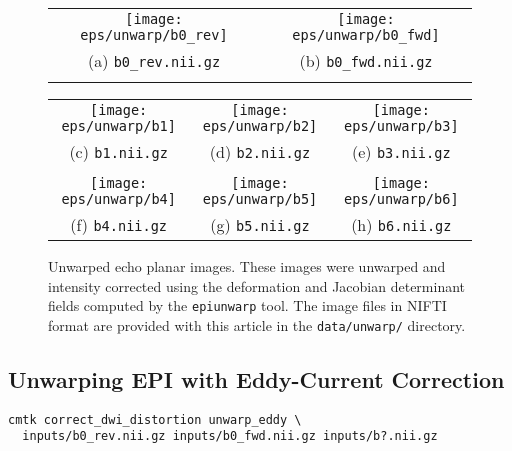 \documentclass{InsightArticle}
\begin{document}
\begin{figure}[tbp]
\begin{center}
\begin{tabular}{cc}
\texttt{[image: eps/unwarp/b0\_rev]} &
\texttt{[image: eps/unwarp/b0\_fwd]} \\
(a) \texttt{b0\_rev.nii.gz} & (b)  \texttt{b0\_fwd.nii.gz}\\
\\
\end{tabular}
\begin{tabular}{ccc}
\texttt{[image: eps/unwarp/b1]} &
\texttt{[image: eps/unwarp/b2]} &
\texttt{[image: eps/unwarp/b3]} \\
(c) \texttt{b1.nii.gz} & (d) \texttt{b2.nii.gz} & (e) \texttt{b3.nii.gz} \\
\\
\texttt{[image: eps/unwarp/b4]} &
\texttt{[image: eps/unwarp/b5]} &
\texttt{[image: eps/unwarp/b6]} \\
(f) \texttt{b4.nii.gz} & (g) \texttt{b5.nii.gz} & (h) \texttt{b6.nii.gz} \\
\end{tabular}
\end{center}
\caption{Unwarped echo planar images. These images were unwarped and intensity
corrected using the deformation and Jacobian determinant fields computed by
the \texttt{epiunwarp} tool. The image files in NIFTI format are provided with
this article in the \texttt{data/unwarp/} directory.}
\label{fig:Unwarp}
\end{figure}

\subsection{Unwarping EPI with Eddy-Current Correction}

\begin{verbatim}
cmtk correct_dwi_distortion unwarp_eddy \
  inputs/b0_rev.nii.gz inputs/b0_fwd.nii.gz inputs/b?.nii.gz
\end{verbatim}
\end{document}
